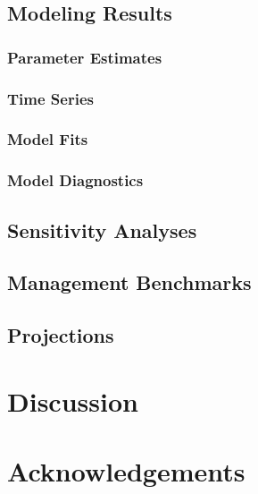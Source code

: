 \documentclass[
]{scrartcl}
\begin{document}
\newpage{}

\subsection{Modeling Results}\label{sec-assmt-results}

\subsubsection{Parameter Estimates}\label{parameter-estimates}

\subsubsection{Time Series}\label{time-series}

\subsubsection{Model Fits}\label{model-fits}

\subsubsection{Model Diagnostics}\label{model-diagnostics}

\newpage{}

\subsection{Sensitivity Analyses}\label{sec-assmt-sens}

\newpage{}

\subsection{Management Benchmarks}\label{sec-assmt-bench}

\newpage{}

\subsection{Projections}\label{sec-assmt-proj}

\newpage{}

\section{Discussion}\label{sec-discussion}

\newpage{}

\section{Acknowledgements}\label{sec-acknowledgements}
\end{document}
